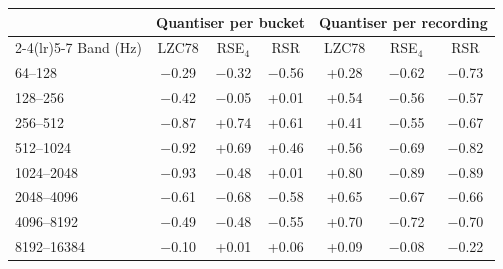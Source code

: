 \begin{tabular}{lcccccc}
\toprule
 & \multicolumn{3}{c}{Quantiser per bucket} & \multicolumn{3}{c}{Quantiser per recording}\\
\cmidrule(lr){2-4}\cmidrule(lr){5-7}
Band (Hz) & LZC78 & RSE$_4$ & RSR & LZC78 & RSE$_4$ & RSR\\
\midrule
64--128 & $-$0.29 & $-$0.32 & $-$0.56 & +0.28 & $-$0.62 & $-$0.73\\
128--256 & $-$0.42 & $-$0.05 & +0.01 & +0.54 & $-$0.56 & $-$0.57\\
256--512 & $-$0.87 & +0.74 & +0.61 & +0.41 & $-$0.55 & $-$0.67\\
512--1024 & $-$0.92 & +0.69 & +0.46 & +0.56 & $-$0.69 & $-$0.82\\
1024--2048 & $-$0.93 & $-$0.48 & +0.01 & +0.80 & $-$0.89 & $-$0.89\\
2048--4096 & $-$0.61 & $-$0.68 & $-$0.58 & +0.65 & $-$0.67 & $-$0.66\\
4096--8192 & $-$0.49 & $-$0.48 & $-$0.55 & +0.70 & $-$0.72 & $-$0.70\\
8192--16384 & $-$0.10 & +0.01 & +0.06 & +0.09 & $-$0.08 & $-$0.22\\
\bottomrule
\end{tabular}
